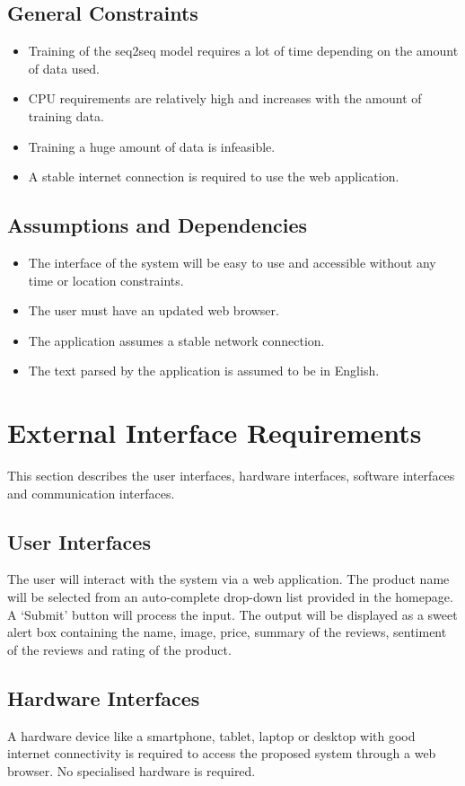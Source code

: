 \documentclass[11pt]{report}
\begin{document}
\subsection{General Constraints}
\begin{itemize}
\item Training of the seq2seq model requires a lot of time depending on the amount of data used.
\item CPU requirements are relatively high and increases with the amount of training data.
\item Training a huge amount of data is infeasible.
\item A stable internet connection is required to use the web application.
\end{itemize}

\subsection{Assumptions and Dependencies}
\begin{itemize}
\item The interface of the system will be easy to use and accessible without any time or location constraints.
\item The user must have an updated web browser.
\item The application assumes a stable network connection.
\item The text parsed by the application is assumed to be in English.
\end{itemize}

\section{External Interface Requirements}
This section describes the user interfaces, hardware interfaces, software interfaces and communication interfaces.

\subsection{User Interfaces}
The user will interact with the system via a web application. The product name will be selected from an auto-complete drop-down list provided in the homepage. 
A ‘Submit’ button will process the input. The output will be displayed as a sweet alert box containing the name, image, price, summary of the reviews, sentiment of the reviews and rating of the product.

\subsection{Hardware Interfaces}
A hardware device like a smartphone, tablet, laptop or desktop with good internet connectivity is required to access the proposed system through a web browser. No specialised hardware is required.
\end{document}
